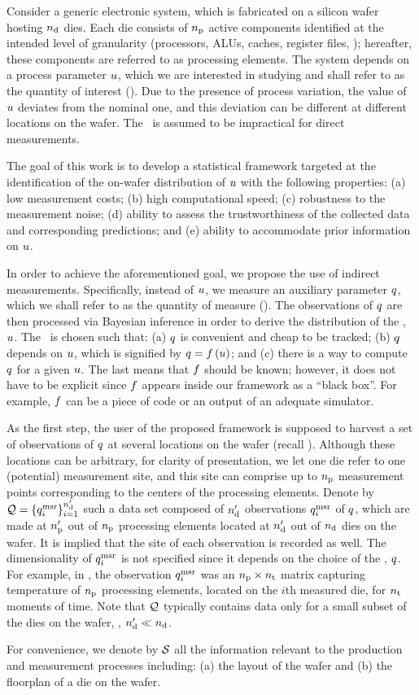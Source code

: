Consider a generic electronic system, which is fabricated on a silicon wafer hosting ${n_\text{d}}$ dies.
Each die consists of ${n_\text{p}}$ active components identified at the intended level of granularity (processors, ALUs, caches, register files, \etc); hereafter, these components are referred to as processing elements.
The system depends on a process parameter $u$, which we are interested in studying and shall refer to as the quantity of interest (\qoi).
Due to the presence of process variation, the value of $u$ deviates from the nominal one, and this deviation can be different at different locations on the wafer.
The \qoi\ is assumed to be impractical for direct measurements.

The goal of this work is to develop a statistical framework targeted at the identification of the on-wafer distribution of $u$ with the following properties: (a) low measurement costs; (b) high computational speed; (c) robustness to the measurement noise; (d) ability to assess the trustworthiness of the collected data and corresponding predictions; and (e) ability to accommodate prior information on $u$.

In order to achieve the aforementioned goal, we propose the use of indirect measurements.
Specifically, instead of $u$, we measure an auxiliary parameter $q$, which we shall refer to as the quantity of measure (\qom).
The observations of $q$ are then processed via Bayesian inference in order to derive the distribution of the \qoi, $u$.
The \qom\ is chosen such that: (a) $q$ is convenient and cheap to be tracked; (b) $q$ depends on $u$, which is signified by $\q = \oBB{\u}$; and (c) there is a way to compute $q$ for a given $u$.
The last means that $\oBB$ should be known; however, it does not have to be explicit since $\oBB$ appears inside our framework as a ``black box''.
For example, $\oBB$ can be a piece of code or an output of an adequate simulator.

As the first step, the user of the proposed framework is supposed to harvest a set of observations of $q$ at several locations on the wafer (recall ).
Although these locations can be arbitrary, for clarity of presentation, we let one die refer to one (potential) measurement site, and this site can comprise up to ${n_\text{p}}$ measurement points corresponding to the centers of the processing elements.
Denote by $\mathcal{Q} = \{ q_i^{\text{msr}} \}_{i = 1}^{n_\text{d}'}$ such a data set composed of ${n_\text{d}'}$ observations $q_i^{\text{msr}}$ of $q$, which are made at ${n_\text{p}'}$ out of ${n_\text{p}}$ processing elements located at ${n_\text{d}'}$ out of ${n_\text{d}}$ dies on the wafer.
It is implied that the site of each observation is recorded as well.
The dimensionality of $q_i^{\text{msr}}$ is not specified since it depends on the choice of the \qom, $q$.
For example, in , the observation $q_i^{\text{msr}}$ was an ${n_\text{p}} \times {n_\text{t}}$ matrix capturing temperature of ${n_\text{p}}$ processing elements, located on the $i$th measured die, for ${n_\text{t}}$ moments of time.
Note that $\mathcal{Q}$ typically contains data only for a small subset of the dies on the wafer, \ie, ${n_\text{d}'} \ll {n_\text{d}}$.

For convenience, we denote by $\mathcal{S}$ all the information relevant to the production and measurement processes including: (a) the layout of the wafer and (b) the floorplan of a die on the wafer.
